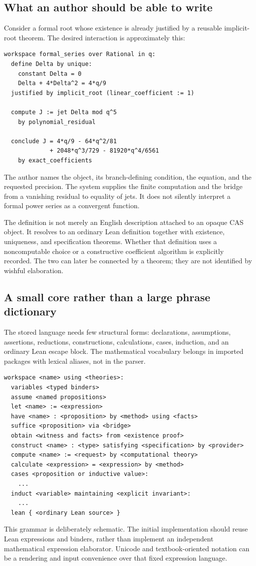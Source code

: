 \documentclass[11pt,letterpaper]{article}
\theoremstyle{definition}
\theoremstyle{remark}
\begin{document}
\subsection{What an author should be able to write}
Consider a formal root whose existence is already justified by a reusable
implicit-root theorem. The desired interaction is approximately this:
\begin{lstlisting}
workspace formal_series over Rational in q:
  define Delta by unique:
    constant Delta = 0
    Delta + 4*Delta^2 = 4*q/9
  justified by implicit_root (linear_coefficient := 1)

  compute J := jet Delta mod q^5
    by polynomial_residual

  conclude J = 4*q/9 - 64*q^2/81
             + 2048*q^3/729 - 81920*q^4/6561
    by exact_coefficients
\end{lstlisting}
The author names the object, its branch-defining condition, the equation, and
the requested precision. The system supplies the finite computation and the
bridge from a vanishing residual to equality of jets. It does not silently
interpret a formal power series as a convergent function.

The definition is not merely an English description attached to an opaque CAS
object. It resolves to an ordinary Lean definition together with existence,
uniqueness, and specification theorems. Whether that definition uses a
noncomputable choice or a constructive coefficient algorithm is explicitly
recorded. The two can later be connected by a theorem; they are not identified
by wishful elaboration.

\subsection{A small core rather than a large phrase dictionary}
The stored language needs few structural forms: declarations, assumptions,
assertions, reductions, constructions, calculations, cases, induction, and an
ordinary Lean escape block. The mathematical vocabulary belongs in imported
packages with lexical aliases, not in the parser.

\begin{lstlisting}
workspace <name> using <theories>:
  variables <typed binders>
  assume <named propositions>
  let <name> := <expression>
  have <name> : <proposition> by <method> using <facts>
  suffice <proposition> via <bridge>
  obtain <witness and facts> from <existence proof>
  construct <name> : <type> satisfying <specification> by <provider>
  compute <name> := <request> by <computational theory>
  calculate <expression> = <expression> by <method>
  cases <proposition or inductive value>:
    ...
  induct <variable> maintaining <explicit invariant>:
    ...
  lean { <ordinary Lean source> }
\end{lstlisting}
This grammar is deliberately schematic. The initial implementation should reuse
Lean expressions and binders, rather than implement an independent mathematical
expression elaborator. Unicode and textbook-oriented notation can be a rendering
and input convenience over that fixed expression language.
\end{document}
